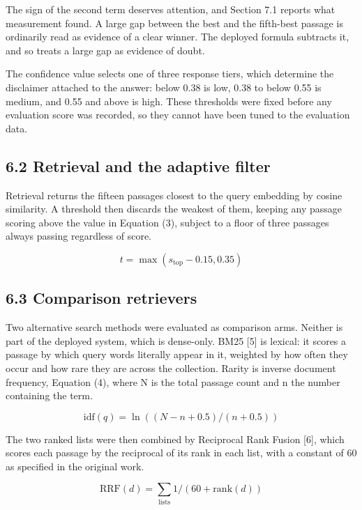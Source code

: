 \documentclass[12pt,a4paper]{article}
\begin{document}
The sign of the second term deserves attention, and Section 7.1 reports what measurement found. A large gap between the best and the fifth-best passage is ordinarily read as evidence of a clear winner. The deployed formula subtracts it, and so treats a large gap as evidence of doubt.

The confidence value selects one of three response tiers, which determine the disclaimer attached to the answer: below 0.38 is low, 0.38 to below 0.55 is medium, and 0.55 and above is high. These thresholds were fixed before any evaluation score was recorded, so they cannot have been tuned to the evaluation data.

\subsection*{6.2 Retrieval and the adaptive filter}
Retrieval returns the fifteen passages closest to the query embedding by cosine similarity. A threshold then discards the weakest of them, keeping any passage scoring above the value in Equation (3), subject to a floor of three passages always passing regardless of score.


\begin{equation}
t  =  \max( s_{\text{top}} - 0.15 ,  0.35 )
\end{equation}


\subsection*{6.3 Comparison retrievers}
Two alternative search methods were evaluated as comparison arms. Neither is part of the deployed system, which is dense-only. BM25 [5] is lexical: it scores a passage by which query words literally appear in it, weighted by how often they occur and how rare they are across the collection. Rarity is inverse document frequency, Equation (4), where N is the total passage count and n the number containing the term.


\begin{equation}
\mathrm{idf}(q)  =  \ln( ( N - n + 0.5 ) / ( n + 0.5 ) )
\end{equation}


The two ranked lists were then combined by Reciprocal Rank Fusion [6], which scores each passage by the reciprocal of its rank in each list, with a constant of 60 as specified in the original work.


\begin{equation}
\mathrm{RRF}(d)  =  \sum_{\text{lists}}  1 / ( 60 + \mathrm{rank}(d) )
\end{equation}
\end{document}
